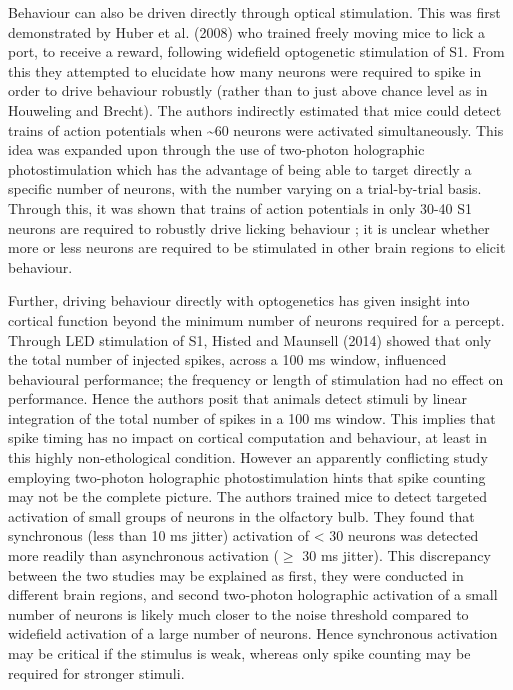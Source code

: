 Behaviour can also be driven directly through optical stimulation. This was first demonstrated by Huber et al. (2008) \cite{huber_sparse_2008} who trained freely moving mice to lick a port, to receive a reward, following widefield optogenetic stimulation of S1. From this they attempted to elucidate how many neurons were required to spike in order to drive behaviour robustly (rather than to just above chance level as in Houweling and Brecht). The authors indirectly estimated that mice could detect trains of action potentials when \textasciitilde 60 neurons were activated simultaneously. This idea was expanded upon through the use of two-photon holographic photostimulation which has the advantage of being able to target directly a specific number of neurons, with the number varying on a trial-by-trial basis. Through this, it was shown that trains of action potentials in only 30-40 S1 neurons are required to robustly drive licking behaviour \cite{dalgleish_how_2020}; it is unclear whether more or less neurons are required to be stimulated in other brain regions to elicit behaviour. 

Further, driving behaviour directly with optogenetics has given insight into cortical function beyond the minimum number of neurons required for a percept. Through LED stimulation of S1, Histed and Maunsell (2014) \cite{histed_cortical_2014} showed that only the total number of injected spikes, across a 100 ms window, influenced behavioural performance; the frequency or length of stimulation had no effect on performance. Hence the authors posit that animals detect stimuli by linear integration of the total number of spikes in a 100 ms window. This implies that spike timing has no impact on cortical computation and behaviour, at least in this highly non-ethological condition. However an apparently conflicting study \cite{gill_precise_2020} employing two-photon holographic photostimulation hints that spike counting may not be the complete picture. The authors trained mice to detect targeted activation of small groups of neurons in the olfactory bulb. They found that synchronous (less than 10 ms jitter) activation of < 30 neurons was detected more readily than asynchronous activation ($\geqslant$ 30 ms jitter). This discrepancy between the two studies may be explained as first, they were conducted in different brain regions, and second two-photon holographic activation of a small number of neurons is likely much closer to the noise threshold compared to widefield activation of a large number of neurons. Hence synchronous activation may be critical if the stimulus is weak, whereas only spike counting may be required for stronger stimuli.

